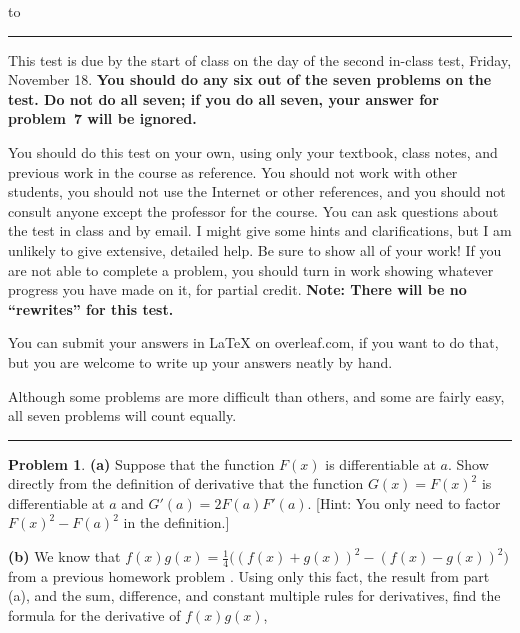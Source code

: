 \documentclass[12pt]{article}
\theoremstyle{definition}
\newtheorem{problem}{Problem}
\newenvironment{answer}{\par\medskip\bgroup\color{darkblue}}{\egroup\par\medskip}
\begin{document}
\hbox to 
\nointerlineskip
\vskip 3pt
\hrule height 1pt

\medskip

{\narrower\narrower\small{
This test is due by the start of class on the day of the second in-class test, Friday, November 18.  
\textbf{You should do any six out of the seven problems on the test.  Do not do
all seven; if you do all seven, your answer for problem~7 will be ignored.}\par
You should do this test on your own, using only your textbook, class notes, 
and previous work in the course as reference.  You should
not work with other students, you should not use the Internet or other references, and you should not
consult anyone except the professor for the course.  You can ask questions about the test in class and by email.
I might give some hints and clarifications, but I am unlikely to give
extensive, detailed help.   Be sure to show all of
your work!  If you are not able to complete a problem, you should turn in work showing
whatever progress you have made on it, for partial credit.
\textbf{Note: There will be no ``rewrites'' for this test.}\par
You can submit your answers in LaTeX on overleaf.com, if you want to do 
that, but you are welcome to write up your answers neatly by hand.\par
Although some problems are more difficult than others, and some are fairly easy, 
all seven problems will count equally.}
\par}

\medskip
\hrule height 1pt
\bigskip


\def\ds{\displaystyle}


\begin{problem} %
\textbf{(a)} Suppose that the function $F(x)$ is differentiable at $a$.  Show directly from the definition
of derivative that the function $G(x) = F(x)^2$ is differentiable at $a$ and $G'(a)=2F(a)F'(a)$.
[Hint: You only need to factor $F(x)^2-F(a)^2$ in the definition.]

\textbf{(b)} We know that $f(x)g(x) = \frac{1}{4}\big((f(x)+g(x))^2-(f(x)-g(x))^2\big)$ from a previous homework problem .
Using only this fact, the result from part (a), and the sum, difference, and constant multiple rules for derivatives,
find the formula for the derivative of $f(x)g(x)$, 
\end{problem}

\begin{answer}
\end{answer}
\end{document}
